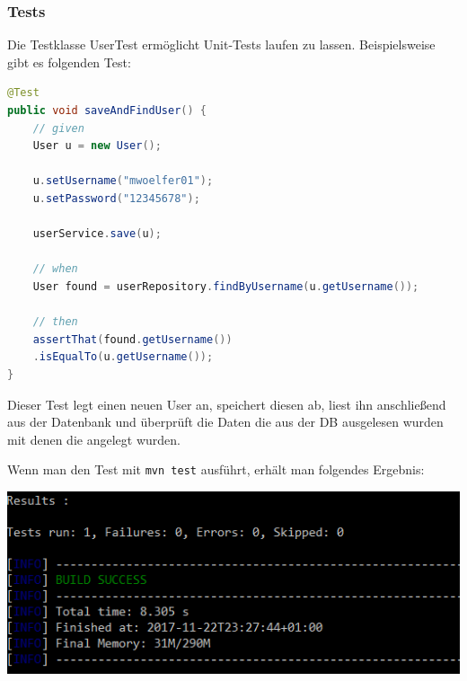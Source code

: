 \subsubsection{Tests}
Die Testklasse UserTest ermöglicht Unit-Tests laufen zu lassen. Beispielsweise gibt es folgenden Test:

\begin{lstlisting}[language=Java]
@Test
public void saveAndFindUser() {
	// given
	User u = new User();
	
	u.setUsername("mwoelfer01");
	u.setPassword("12345678");
	
	userService.save(u);
	
	// when
	User found = userRepository.findByUsername(u.getUsername());
	
	// then
	assertThat(found.getUsername())
	.isEqualTo(u.getUsername());
}
\end{lstlisting}

Dieser Test legt einen neuen User an, speichert diesen ab, liest ihn anschließend aus der Datenbank und überprüft die Daten die aus der DB ausgelesen wurden mit denen die angelegt wurden.

Wenn man den Test mit \verb|mvn test| ausführt, erhält man folgendes Ergebnis:

\begin{minipage}{\linewidth}
	\centering
	\includegraphics[width=0.6\linewidth]{images/tests}
\end{minipage}
